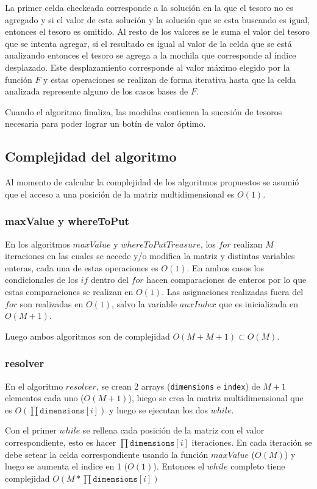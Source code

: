 La primer celda checkeada corresponde a la solución en la que el tesoro no es agregado y si el valor de esta solución y la solución que se esta buscando es igual, entonces el tesoro es omitido.
Al resto de los valores se le suma el valor del tesoro que se intenta agregar, si el resultado es igual al valor de la celda que se está analizando entonces el tesoro se agrega a la mochila que corresponde al índice desplazado. 
Este desplazamiento corresponde al valor máximo elegido por la función $F$ y estas operaciones se realizan de forma iterativa hasta que la celda analizada represente alguno de los casos bases de $F$.

Cuando el algoritmo finaliza, las mochilas contienen la sucesión de tesoros necesaria para poder lograr un botín de valor óptimo.

\subsection{Complejidad del algoritmo}

Al momento de calcular la complejidad de los algoritmos propuestos se asumió que el acceso a una posición de la matriz multidimensional es $O(1)$. 

\subsubsection{maxValue y whereToPut}
En los algoritmos $maxValue$ y $whereToPutTreasure$, los $for$ realizan $M$ iteraciones en las cuales se accede y/o modifica la matriz y distintas variables enteras, cada una de estas operaciones es $O(1)$. En ambos casos los condicionales de los $if$ dentro del $for$ hacen comparaciones de enteros por lo que estas comparaciones se realizan en $O(1)$.
Las asignaciones realizadas fuera del $for$ son realizadas en $O(1)$, salvo la variable $auxIndex$ que es inicializada en $O(M+1)$.

Luego ambos algoritmos son de complejidad $O(M + M + 1) \subset O(M)$.

\subsubsection{resolver}
En el algoritmo $resolver$, se crean 2 arrays (\texttt{dimensions} e \texttt{index}) de $M+1$ elementos cada uno ($O(M+1)$), luego se crea la matriz multidimensional que es $O\left(\prod\texttt{dimensions}[i]\right)$ y luego se ejecutan los dos $while$. 

Con el primer $while$ se rellena cada posición de la matriz con el valor correspondiente, esto es hacer $\prod\texttt{dimensions}[i]$ iteraciones. En cada iteración se debe setear la celda correspondiente usando la función $maxValue$ ($O(M)$) y luego se aumenta el indice en 1 ($O(1)$). Entonces el $while$ completo tiene complejidad $O\left(M*\prod\texttt{dimensions}[i]\right)$

